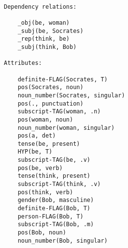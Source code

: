 \begin{verbatim}

Dependency relations:

    _obj(be, woman)
    _subj(be, Socrates)
    _rep(think, be)
    _subj(think, Bob)

Attributes:

    definite-FLAG(Socrates, T)
    pos(Socrates, noun)
    noun_number(Socrates, singular)
    pos(., punctuation)
    subscript-TAG(woman, .n)
    pos(woman, noun)
    noun_number(woman, singular)
    pos(a, det)
    tense(be, present)
    HYP(be, T)
    subscript-TAG(be, .v)
    pos(be, verb)
    tense(think, present)
    subscript-TAG(think, .v)
    pos(think, verb)
    gender(Bob, masculine)
    definite-FLAG(Bob, T)
    person-FLAG(Bob, T)
    subscript-TAG(Bob, .m)
    pos(Bob, noun)
    noun_number(Bob, singular)

\end{verbatim}


